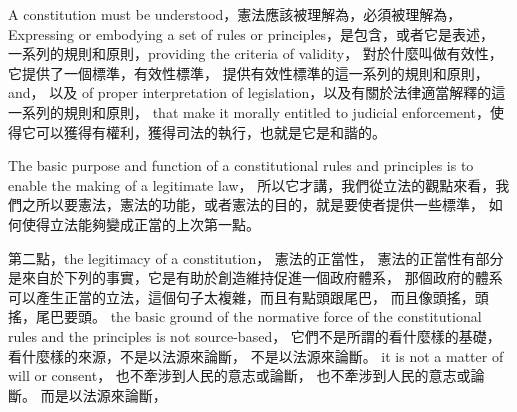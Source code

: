 \hypertarget{w02:cue:78}{}A constitution must be understood，憲法應該被理解為，必須被理解為，
\hypertarget{w02:cue:79}{}Expressing or embodying a set of rules or principles，是包含，或者它是表述，
\hypertarget{w02:cue:80}{}一系列的規則和原則，providing the criteria of validity，
\hypertarget{w02:cue:81}{}對於什麼叫做有效性，它提供了一個標準，有效性標準，
\hypertarget{w02:cue:82}{}提供有效性標準的這一系列的規則和原則，and，
\hypertarget{w02:cue:83}{}以及 of proper interpretation of legislation，以及有關於法律適當解釋的這一系列的規則和原則，
\hypertarget{w02:cue:84}{}that make it morally entitled to judicial enforcement，使得它可以獲得有權利，獲得司法的執行，也就是它是和諧的。

\hypertarget{w02:cue:85}{}The basic purpose and function of a constitutional rules and principles is to enable the making of a legitimate law，
\hypertarget{w02:cue:86}{}所以它才講，我們從立法的觀點來看，我們之所以要憲法，憲法的功能，或者憲法的目的，就是要使者提供一些標準，
\hypertarget{w02:cue:87}{}如何使得立法能夠變成正當的上次第一點。

\hypertarget{w02:cue:88}{}第二點，the legitimacy of a constitution，
\hypertarget{w02:cue:89}{}憲法的正當性，
\hypertarget{w02:cue:90}{}憲法的正當性有部分是來自於下列的事實，它是有助於創造維持促進一個政府體系，
\hypertarget{w02:cue:91}{}那個政府的體系可以產生正當的立法，這個句子太複雜，而且有點頭跟尾巴，
\hypertarget{w02:cue:92}{}而且像頭搖，頭搖，尾巴要頭。
\hypertarget{w02:cue:93}{}the basic ground of the normative force of the constitutional rules and the principles is not source-based，
\hypertarget{w02:cue:94}{}它們不是所謂的看什麼樣的基礎，看什麼樣的來源，不是以法源來論斷，
\hypertarget{w02:cue:95}{}不是以法源來論斷。
\hypertarget{w02:cue:96}{}it is not a matter of will or consent，
\hypertarget{w02:cue:97}{}也不牽涉到人民的意志或論斷，
\hypertarget{w02:cue:98}{}也不牽涉到人民的意志或論斷。
\hypertarget{w02:cue:99}{}而是以法源來論斷，

